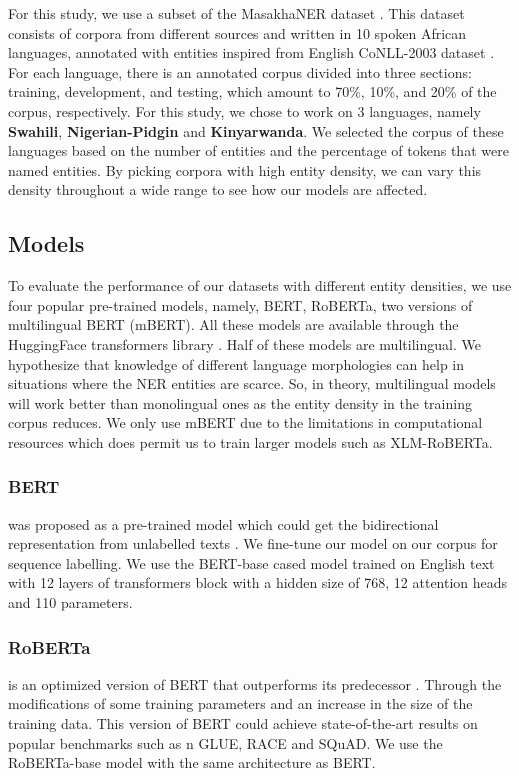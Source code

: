 \documentclass[11pt,a4paper]{article}
\begin{document}
For this study, we use a subset of the MasakhaNER dataset \cite{10.1162/tacl_a_00416}. This dataset consists of corpora from different sources and written in 10 spoken African languages, annotated with entities inspired from English CoNLL-2003 dataset \cite{tjong-kim-sang-2002-introduction}. For each language, there is an annotated corpus divided into three sections: training, development, and testing, which amount to 70\%, 10\%, and 20\% of the corpus, respectively. For this study, we chose to work on 3 languages, namely \textbf{Swahili}, \textbf{Nigerian-Pidgin} and \textbf{Kinyarwanda}. We selected the corpus of these languages based on the number of entities and the percentage of tokens that were named entities. By picking corpora with high entity density, we can vary this density throughout a wide range to see how our models are affected.

\subsection{Models}
To evaluate the performance of our datasets with different entity densities, we use four popular pre-trained models, namely, BERT, RoBERTa, two versions of multilingual BERT
(mBERT). All these models are available through the HuggingFace transformers library \cite{DBLP:journals/corr/abs-1910-03771}. Half of these models are multilingual. We hypothesize that knowledge of different language morphologies can help in situations where the NER entities are scarce. So, in theory, multilingual models will work better than monolingual ones as the entity density in the training corpus reduces. We only use mBERT due to the limitations in computational resources which does permit us to train larger models such as XLM-RoBERTa.

\subsubsection*{BERT} was proposed as a pre-trained model which could get the bidirectional representation from unlabelled texts \cite{DBLP:journals/corr/abs-1810-04805}. We fine-tune our model on our corpus for sequence labelling. We use the BERT-base cased model trained on English text with 12 layers of transformers block with a hidden size of 768, 12 attention heads and 110 parameters.

\subsubsection*{RoBERTa} is an optimized version of BERT that outperforms its predecessor \cite{DBLP:journals/corr/abs-1907-11692}. Through the modifications of some training parameters and an increase in the size of the training data. This version of BERT could achieve state-of-the-art results on popular benchmarks such as n GLUE, RACE and SQuAD. We use the RoBERTa-base model with the same architecture as BERT.
\end{document}
